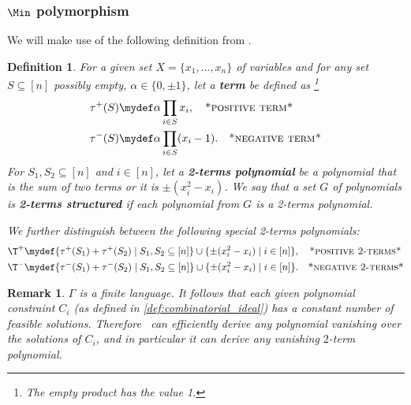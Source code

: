 \documentclass[11pt]{article}
\newtheorem{definition}[theorem]{Definition}
\newtheorem{remark}[theorem]{Remark}
\begin{document}
%

\subsubsection[Min polymorphism]{$\Min$ polymorphism}

We will make use of the following definition from \cite{Mastrolilli21TALG}.
\begin{definition}\label{def:2terms}
  For a given set $X=\{x_1,\ldots,x_n\}$ of variables and for any set $S\subseteq [n]$ possibly empty, $\alpha\in \{0, \pm 1\}$, let a \textbf{\emph{term}} be defined as \footnote{The empty product has the value 1.}
  \begin{align*}
    \tau^+(S)&\mydef \alpha\prod_{i\in S}x_i, \quad \textsc{*positive term*} \\
    \tau^-(S)&\mydef\alpha\prod_{i\in S}(x_i-1). \quad \textsc{*negative term*}
  \end{align*}
  For $S_1,S_2\subseteq [n]$ and $i\in [n]$, let a \textbf{\emph{2-terms polynomial}} be a polynomial that is the sum of two terms or it is $\pm(x_i^2-x_i)$.
  We say that a set $G$ of polynomials is \textbf{\emph{2-terms structured}} if each polynomial from $G$ is a 2-terms polynomial.

  We further distinguish between the following special 2-terms polynomials:
  \begin{align*}
    \T^+ & \mydef \{\tau^+(S_1)+\tau^+(S_2)\mid S_1,S_2\subseteq[n]\} \cup\{\pm(x_i^2-x_i)\mid i\in [n]\},  \quad \textsc{*positive 2-terms*}\\
    \T^- & \mydef \{\tau^-(S_1)+\tau^-(S_2)\mid S_1,S_2\subseteq[n]\} \cup\{\pm(x_i^2-x_i)\mid i\in [n]\}. \quad \textsc{*negative 2-terms*}
  \end{align*}
  \end{definition}

\begin{remark}
$\Gamma$ is a finite language. It follows that each given polynomial constraint $C_i$ (as defined in \cref{def:combinatorial_ideal}) has a constant number of feasible solutions.
Therefore \PC\ can efficiently derive any polynomial vanishing over the solutions of $C_i$, and in particular it can derive any vanishing $2$-term polynomial.
\end{remark}
\end{document}
